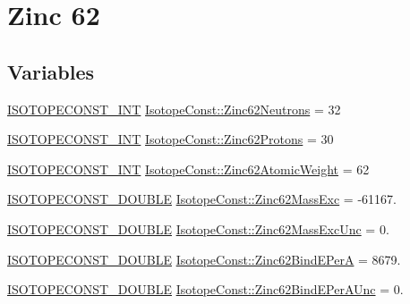 \hypertarget{group___isotope_const-_zinc-_zn62}{}\section{Zinc 62}
\label{group___isotope_const-_zinc-_zn62}
\subsection*{Variables}
\begin{DoxyCompactItemize}
\item 
\mbox{\hyperlink{group___isotope_const-_macros_ga5f18360b3e99483a35c32d789e62621c}{I\+S\+O\+T\+O\+P\+E\+C\+O\+N\+S\+T\+\_\+\+I\+NT}} \mbox{\hyperlink{group___isotope_const-_zinc-_zn62_ga62a2805b410ffb00d44f722f645a9c4f}{Isotope\+Const\+::\+Zinc62\+Neutrons}} = 32
\item 
\mbox{\hyperlink{group___isotope_const-_macros_ga5f18360b3e99483a35c32d789e62621c}{I\+S\+O\+T\+O\+P\+E\+C\+O\+N\+S\+T\+\_\+\+I\+NT}} \mbox{\hyperlink{group___isotope_const-_zinc-_zn62_ga20fda4eca41fbd3226019c05f00f0d4a}{Isotope\+Const\+::\+Zinc62\+Protons}} = 30
\item 
\mbox{\hyperlink{group___isotope_const-_macros_ga5f18360b3e99483a35c32d789e62621c}{I\+S\+O\+T\+O\+P\+E\+C\+O\+N\+S\+T\+\_\+\+I\+NT}} \mbox{\hyperlink{group___isotope_const-_zinc-_zn62_gad3f0229c7910c179277b7816dce76b1c}{Isotope\+Const\+::\+Zinc62\+Atomic\+Weight}} = 62
\item 
\mbox{\hyperlink{group___isotope_const-_macros_ga8f45a7272ce02c0b4c65c44636ed719a}{I\+S\+O\+T\+O\+P\+E\+C\+O\+N\+S\+T\+\_\+\+D\+O\+U\+B\+LE}} \mbox{\hyperlink{group___isotope_const-_zinc-_zn62_ga7eced16f5a9d6bedcaa43e45fe1f2348}{Isotope\+Const\+::\+Zinc62\+Mass\+Exc}} = -\/61167.
\item 
\mbox{\hyperlink{group___isotope_const-_macros_ga8f45a7272ce02c0b4c65c44636ed719a}{I\+S\+O\+T\+O\+P\+E\+C\+O\+N\+S\+T\+\_\+\+D\+O\+U\+B\+LE}} \mbox{\hyperlink{group___isotope_const-_zinc-_zn62_ga3f536f9681f745d2e514f812ec6fbc56}{Isotope\+Const\+::\+Zinc62\+Mass\+Exc\+Unc}} = 0.
\item 
\mbox{\hyperlink{group___isotope_const-_macros_ga8f45a7272ce02c0b4c65c44636ed719a}{I\+S\+O\+T\+O\+P\+E\+C\+O\+N\+S\+T\+\_\+\+D\+O\+U\+B\+LE}} \mbox{\hyperlink{group___isotope_const-_zinc-_zn62_ga8a6341826f4ca38e40ef8d7ef897dbdb}{Isotope\+Const\+::\+Zinc62\+Bind\+E\+PerA}} = 8679.
\item 
\mbox{\hyperlink{group___isotope_const-_macros_ga8f45a7272ce02c0b4c65c44636ed719a}{I\+S\+O\+T\+O\+P\+E\+C\+O\+N\+S\+T\+\_\+\+D\+O\+U\+B\+LE}} \mbox{\hyperlink{group___isotope_const-_zinc-_zn62_gae633f7e42c90d1babd6bddb6eb307ec2}{Isotope\+Const\+::\+Zinc62\+Bind\+E\+Per\+A\+Unc}} = 0.

\end{DoxyCompactItemize}
